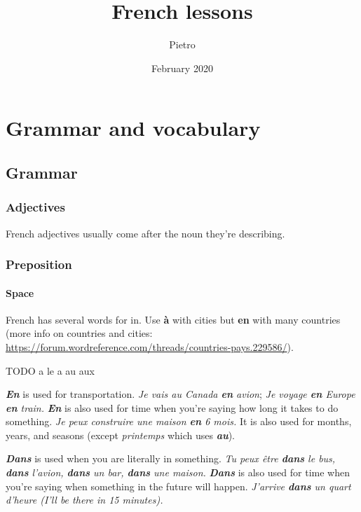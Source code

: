 \documentclass[a4paper,11pt,oneside]{book}
\title{French lessons}
\author{Pietro}
\date{February 2020}
\newcommand{\outref}[1]{\url{#1}}
\newcommand{\frtext}[1]{\emph{#1}}
\begin{document}
 
\frontmatter

\maketitle

\tableofcontents

\mainmatter

\chapter{Grammar and vocabulary}

\section{Grammar}

\subsection{Adjectives}

French adjectives usually come after the noun they’re describing.

\subsection{Preposition}

\subsubsection{Space}

French has several words for in.
Use \textbf{à} with cities but \textbf{en} with many countries
(more info on countries and cities: \outref{https://forum.wordreference.com/threads/countries-pays.229586/}).

TODO a le a au aux


\frtext{\textbf{En}} is used for transportation.
\frtext{Je vais au Canada \textbf{en} avion};
\frtext{Je voyage \textbf{en} Europe \textbf{en} train.}
\frtext{\textbf{En}} is also used for time when you're saying how long it takes to do something.
\frtext{Je peux construire une maison \textbf{en} 6 mois.}
It is also used for months, years, and seasons (except \frtext{printemps} which uses \frtext{\textbf{au}}).

\frtext{\textbf{Dans}} is used when you are literally in something.
\frtext{Tu peux être \textbf{dans} le bus, \textbf{dans} l'avion, \textbf{dans} un bar, \textbf{dans} une maison.}
\frtext{\textbf{Dans}} is also used for time when you're saying when something in the future will happen.
\frtext{J'arrive \textbf{dans} un quart d'heure (I'll be there in 15 minutes).}
\end{document}

